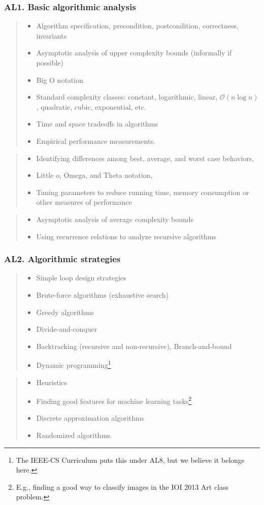 \documentclass[a4paper,11pt,oneside]{article}
\newcommand{\cmark}{\ding{51}}%
\newcommand{\xmark}{\ding{55}}%
\newcommand{\CC}[1]{#1}
\newcommand{\cdef}{{\small\cmark\faFileTextO}}
\newcommand{\ccode}{{\small\cmark\faFileText}}
\newcommand{\cnfoc}{{\small\faQuestion}}
\newcommand{\cexcl}{{\small\xmark}}
\newcommand{\Idefine}{\item[\hbox to 1.8em{\cdef\hfill}]}
\newcommand{\Icodeonly}{\item[\hbox to 1.8em{\ccode\hfill}]}
\newcommand{\Inofocus}{\item[\hbox to 1.8em{\cnfoc\hfill}]}
\newcommand{\Iexcluded}{\item[\hbox to 1.8em{\cexcl\hfill}]}
\newenvironment{myitemize}{\begin{quote}\begin{itemize}\itemsep 0pt}{\end{itemize}\end{quote}}
\begin{document}
    \subsubsection*{AL1. Basic algorithmic analysis}%

    \begin{myitemize}
    \Idefine Algorithm specification, precondition, postcondition, correctness, invariants
    \Icodeonly\CC{Asymptotic analysis of upper complexity bounds} (informally if possible)
    \Icodeonly\CC{Big O notation}
    \Icodeonly\CC{Standard complexity classes}: constant, logarithmic, linear, $\mathcal{O}(n \log n)$, quadratic, cubic, exponential, etc.
    \Icodeonly\CC{Time and space tradeoffs in algorithms}
    \Icodeonly Empirical performance measurements.
    \end{myitemize}

    \begin{myitemize}
    \Inofocus \CC{Identifying differences among best, average, and worst case behaviors},
    \Inofocus \CC{Little o, Omega, and Theta notation},
    \Inofocus Tuning parameters to reduce running time, memory consumption or other measures of performance
    \end{myitemize}
  
    \begin{myitemize}
    \Iexcluded Asymptotic analysis of average complexity bounds
    \Iexcluded Using recurrence relations to analyze recursive algorithms
    \end{myitemize}
  
    \subsubsection*{AL2. Algorithmic strategies}%

    \begin{myitemize}
    \Icodeonly Simple loop design strategies
    \Icodeonly\CC{Brute-force algorithms} (exhaustive search)
    \Icodeonly\CC{Greedy algorithms}
    \Icodeonly\CC{Divide-and-conquer}
    \Icodeonly\CC{Backtracking} (recursive and non-recursive), \CC{Branch-and-bound}
    \Icodeonly\CC{Dynamic programming}\footnote{The IEEE-CS Curriculum puts this under AL8, but we believe it belongs here.} 
    \end{myitemize}
  
    \begin{myitemize}
    \Inofocus Heuristics
    \Inofocus Finding good features for machine learning tasks\footnote{E.g., finding a good way to classify images in the IOI 2013 Art class problem.}
    \Inofocus Discrete approximation algorithms
    \Inofocus Randomized algorithms.
    \end{myitemize}
  
\end{document}
